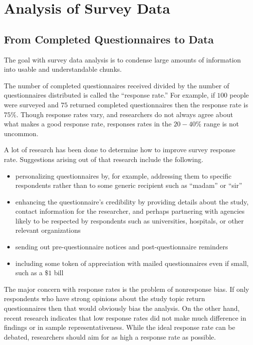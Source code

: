 \section{Analysis of Survey Data}

\subsection{From Completed Questionnaires to Data}

The goal with survey data analysis is to condense large amounts of information into usable and understandable chunks. 

The number of completed questionnaires received divided by the number of questionnaires  distributed is called the ``response rate.'' For example, if $ 100 $ people were surveyed and $ 75 $ returned completed questionnaires then the response rate is $ 75\% $. Though response rates vary, and researchers do not always agree about what makes a good response rate, responses rates in the $ 20-40\% $ range is not uncommon. 

A lot of research has been done to determine how to improve survey response rate. Suggestions arising out of that research include the following.

\begin{itemize}
	\item personalizing questionnaires by, for example, addressing them to specific respondents rather than to some generic recipient such as ``madam'' or ``sir''
	\item enhancing the questionnaire's credibility by providing details about the study, contact information for the researcher, and perhaps partnering with agencies likely to be respected by respondents such as universities, hospitals, or other relevant organizations
	\item sending out pre-questionnaire notices and post-questionnaire reminders
	\item including some token of appreciation with mailed questionnaires even if small, such as a $ \$1 $ bill 
\end{itemize}

The major concern with response rates is the problem of nonresponse bias. If only respondents who have strong opinions about the study topic return questionnaires then that would obviously bias the analysis. On the other hand, recent research indicates that low response rates did not make much difference in findings or in sample representativeness\cite{rindfuss2015low}\cite{wright2015empirical}. While the ideal response rate can be debated, researchers should aim for as high a response rate as possible.

